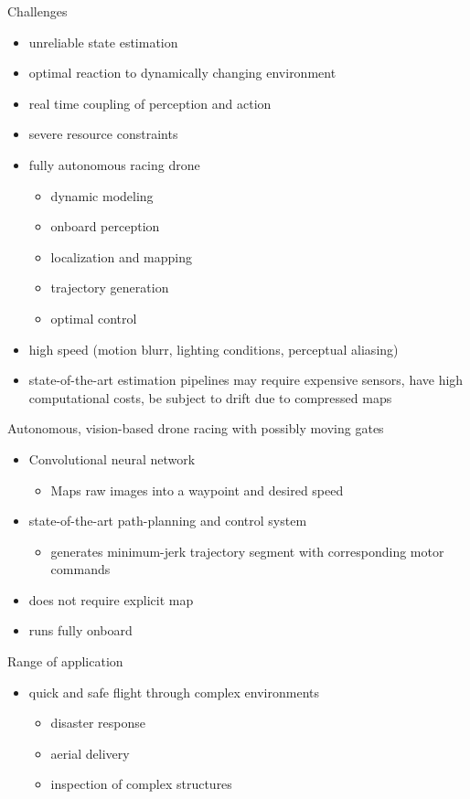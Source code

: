 
Challenges
\begin{itemize}
    \item unreliable state estimation
    \item optimal reaction to dynamically changing environment
    \item real time coupling of perception and action
    \item severe resource constraints
    \item fully autonomous racing drone
    \begin{itemize}
        \item dynamic modeling
        \item onboard perception
        \item localization and mapping
        \item trajectory generation
        \item optimal control
    \end{itemize}
    \item high speed (motion blurr, lighting conditions, perceptual aliasing)
    \item state-of-the-art estimation pipelines may require expensive sensors, have high computational costs, be subject to drift due to compressed maps
\end{itemize}

Autonomous, vision-based drone racing with possibly moving gates
\begin{itemize}
    \item Convolutional neural network
    \begin{itemize}
        \item Maps raw images into a waypoint and desired speed        
    \end{itemize}
    \item state-of-the-art path-planning and control system
    \begin{itemize}
        \item generates minimum-jerk trajectory segment with corresponding motor commands        
    \end{itemize}
    \item does not require explicit map
    \item runs fully onboard
\end{itemize}

Range of application
\begin{itemize}
    \item quick and safe flight through complex environments
    \begin{itemize}
        \item disaster response
        \item aerial delivery
        \item inspection of complex structures 
    \end{itemize}
\end{itemize}

